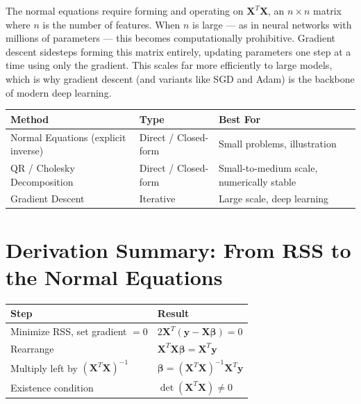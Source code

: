 \documentclass[12pt]{article}
\begin{document}
The normal equations require forming and operating on $\mathbf{X}^T\mathbf{X}$, an $n \times n$ matrix where $n$ is the number of features. When $n$ is large --- as in neural networks with millions of parameters --- this becomes computationally prohibitive. Gradient descent sidesteps forming this matrix entirely, updating parameters one step at a time using only the gradient. This scales far more efficiently to large models, which is why gradient descent (and variants like SGD and Adam) is the backbone of modern deep learning.
 
\begin{center}
\begin{tabular}{@{}lll@{}}
\toprule
\textbf{Method} & \textbf{Type} & \textbf{Best For} \\
\midrule
Normal Equations (explicit inverse) & Direct / Closed-form & Small problems, illustration \\
QR / Cholesky Decomposition & Direct / Closed-form & Small-to-medium scale, numerically stable \\
Gradient Descent & Iterative & Large scale, deep learning \\
\bottomrule
\end{tabular}
\end{center}
 
\section*{Derivation Summary: From RSS to the Normal Equations}
 
\begin{center}
\begin{tabular}{@{}ll@{}}
\toprule
\textbf{Step} & \textbf{Result} \\
\midrule
Minimize RSS, set gradient $= 0$ & $2\mathbf{X}^T(\mathbf{y} - \mathbf{X}\boldsymbol{\beta}) = 0$ \\
Rearrange & $\mathbf{X}^T\mathbf{X}\boldsymbol{\beta} = \mathbf{X}^T\mathbf{y}$ \\
Multiply left by $(\mathbf{X}^T\mathbf{X})^{-1}$ & $\boldsymbol{\beta} = (\mathbf{X}^T\mathbf{X})^{-1}\mathbf{X}^T\mathbf{y}$ \\
Existence condition & $\det(\mathbf{X}^T\mathbf{X}) \neq 0$ \\
\bottomrule
\end{tabular}
\end{center}
 
\end{document}
